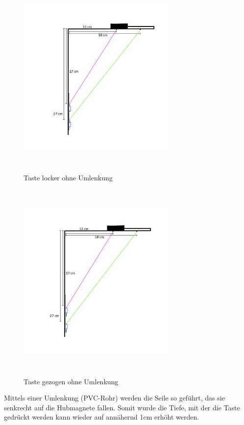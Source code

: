 \begin{figure}[htbp]
	\centering
	\includegraphics[width=8cm, height=10cm]{img/Umlenkung_locker}
	\caption{Taste locker ohne Umlenkung}
	\label{<label>}
\end{figure}

\begin{figure}[htbp]
	\centering
	\includegraphics[width=8cm, height=10cm]{img/Umlenkung_gezogen}
	\caption{Taste gezogen ohne Umlenkung}
	\label{<label>}
\end{figure}

Mittels einer Umlenkung (PVC-Rohr) werden die Seile so geführt, das sie senkrecht auf die Hubmagnete fallen.
Somit wurde die Tiefe, mit der die Taste gedrückt werden kann wieder auf annähernd 1cm erhöht werden.

